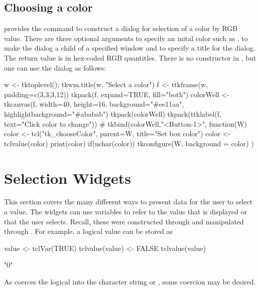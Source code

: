 \subsection{Choosing a color}
\Tk\/ provides the command  to construct a dialog for selection of a color by RGB value. There are three optional arguments  to specify an inital color such as ,  to make the dialog a child of a specified window and  to specify a title for the dialog. The return value is in hex-coded RGB quantitles. 
There is no constructor in , but one can use the dialog as follows:
\begin{Schunk}
\begin{Sinput}
 w <- tktoplevel(); tkwm.title(w, "Select a color")
 f <- ttkframe(w, padding=c(3,3,3,12))
 tkpack(f, expand=TRUE, fill="both")
 colorWell <- tkcanvas(f, width=40, height=16, 
                       background="#ee11aa",
                       highlightbackground="#ababab") 
 tkpack(colorWell)
 tkpack(ttklabel(f, text="Click color to change"))
 #
 tkbind(colorWell,"<Button-1>", function(W) {
   color <- tcl("tk_chooseColor", parent=W, 
                title="Set box color")
   color <- tclvalue(color)
   print(color)
   if(nchar(color))
     tkconfigure(W, background = color)
 })
\end{Sinput}
\end{Schunk}



\section{Selection Widgets}
\label{sec:tcltk:selection-widgets}

This section covers the many different ways to present data for the
user to select a value. The widgets can use \TCL\/ variables to refer
to the value that is displayed or that the user selects.  Recall,
these were constructed through  and manipulated
through .  For example, a logical value can be stored as
\begin{Schunk}
\begin{Sinput}
 value <- tclVar(TRUE)
 tclvalue(value) <- FALSE
 tclvalue(value)
\end{Sinput}
\begin{Soutput}
[1] "0"
\end{Soutput}
\end{Schunk}
As  coerces the logical into the  character string   or , some coercion may be desired.

